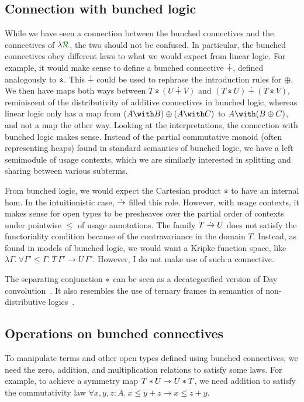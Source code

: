 \subsection{Connection with bunched logic}\label{sec:bunched-logic}
While we have seen a connection between the bunched connectives and the
connectives of $\name$, the two should not be confused.
In particular, the bunched connectives obey different laws to what we would
expect from linear logic.
For example, it would make sense to define a bunched connective $\dotplus$,
defined analogously to $\dottimes$.
This $\dotplus$ could be used to rephrase the introduction rules for $\oplus$.
We then have maps both ways between $T \dottimes (U \dotplus V)$ and
$(T \dottimes U) \dotplus (T \dottimes V)$, reminiscent of the distributivity of
additive connectives in bunched logic,
whereas linear logic only has a map from $(A \with B) \oplus (A \with C)$ to
$A \with (B \oplus C)$, and not a map the other way.
Looking at the interpretations, the connection with bunched logic makes sense.
Instead of the partial commutative monoid (often representing heaps) found in
standard semantics of bunched logic, we have a left semimodule of usage
contexts, which we are similarly interested in splitting and sharing between
various subterms.

From bunched logic, we would expect the Cartesian product $\dottimes$ to have an
internal hom.
In the intuitionistic case, $\mathrel{\dot\to}$ filled this role.
However, with usage contexts, it makes sense for open types to be presheaves
over the partial order of contexts under pointwise $\leq$ of usage annotations.
The family $T \mathrel{\dot\to} U$ does not satisfy the functoriality condition because of
the contravariance in the domain $T$.
Instead, as found in models of bunched logic, we would want a Kripke function
space, like
$\lambda\Gamma.~\forall \Gamma' \leq \Gamma.~T\,\Gamma' \to U\,\Gamma'$.
However, I do not make use of such a connective.

The separating conjunction $\mathbin{*}$ can be seen as a decategorified version of Day
convolution~\citep{Day70}.
It also resembles the use of ternary frames in semantics of non-distributive
logics~\citep[chapter 12]{Restall99}.

\subsection{Operations on bunched connectives}\label{sec:bunched-op}
To manipulate terms and other open types defined using bunched connectives, we
need the zero, addition, and multiplication relations to satisfy some laws.
For example, to achieve a symmetry map $T \mathbin{*} U \rightarrowtriangle U \mathbin{*} T$,
we need addition to satisfy the commutativity law
$\forall x,y,z : A.~x \leq y + z \to x \leq z + y$.

